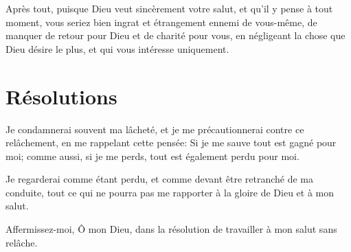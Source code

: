 \documentclass[instructions.tex]{subfiles}
\begin{document}
Après tout, puisque Dieu veut sincèrement votre salut, et qu'il y pense à tout moment, vous seriez bien ingrat et étrangement ennemi de vous-même, de manquer de retour pour Dieu et de charité pour vous, en négligeant la chose que Dieu désire le plus, et qui vous intéresse uniquement.


\section{Résolutions}

\primo Je condamnerai souvent ma lâcheté, et je me précautionnerai contre ce relâchement, en me rappelant cette pensée: Si je me sauve tout est gagné pour moi; comme aussi, si je me perds, tout est également perdu pour moi. 

\secundo Je regarderai comme étant perdu, et comme devant être retranché de ma conduite, tout ce qui ne pourra pas me rapporter à la gloire de Dieu et à mon salut. 

Affermissez-moi, Ô mon Dieu, dans la résolution de travailler à mon salut sans relâche. 
\end{document}
